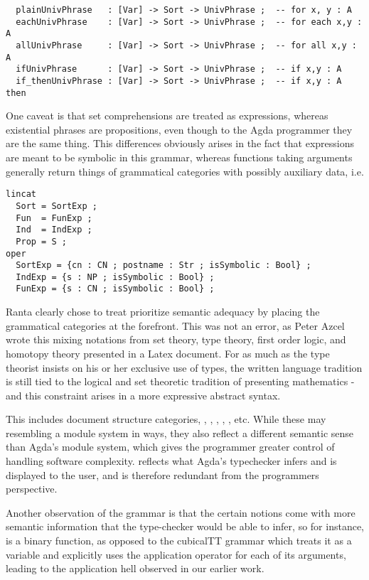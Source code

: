 \begin{verbatim}
  plainUnivPhrase   : [Var] -> Sort -> UnivPhrase ;  -- for x, y : A
  eachUnivPhrase    : [Var] -> Sort -> UnivPhrase ;  -- for each x,y : A
  allUnivPhrase     : [Var] -> Sort -> UnivPhrase ;  -- for all x,y : A
  ifUnivPhrase      : [Var] -> Sort -> UnivPhrase ;  -- if x,y : A
  if_thenUnivPhrase : [Var] -> Sort -> UnivPhrase ;  -- if x,y : A then
\end{verbatim}

One caveat is that set comprehensions are treated as expressions, whereas
existential phrases are propositions, even though to the Agda programmer they
are the same thing. This differences obviously arises in the fact
that expressions are meant to be symbolic in this grammar, whereas functions
taking  arguments generally return things of grammatical categories
with possibly auxiliary data, i.e.

\begin{verbatim}
lincat
  Sort = SortExp ;
  Fun  = FunExp ;
  Ind  = IndExp ; 
  Prop = S ;
oper
  SortExp = {cn : CN ; postname : Str ; isSymbolic : Bool} ;
  IndExp = {s : NP ; isSymbolic : Bool} ;
  FunExp = {s : CN ; isSymbolic : Bool} ;
\end{verbatim}

Ranta clearly chose to treat prioritize semantic adequacy by placing the
grammatical categories at the forefront. This was not an error, as Peter Azcel
wrote this mixing notations from set theory, type theory, first order logic, and
homotopy theory presented in a Latex document. For as much as the
type theorist insists on his or her exclusive use of types, the written language
tradition is still tied to the logical and set theoretic tradition of presenting
mathematics - and this constraint arises in a more expressive abstract syntax. 

This includes document structure categories, , ,
, , , etc. While
these may resembling a module system in ways, they also reflect a different
semantic sense than Agda's module system, which gives the programmer greater
control of handling software complexity.  reflects
what Agda's typechecker infers and is displayed to the user, and is therefore
redundant from the programmers perspective.

Another observation of the grammar is that the certain notions come with more
semantic information that the type-checker would be able to infer, so for
instance, \codewrod {} is a binary function, as opposed to the
cubicalTT grammar which treats it as a variable and explicitly uses the
application operator for each of its arguments, leading to the application hell
observed in our earlier work.

